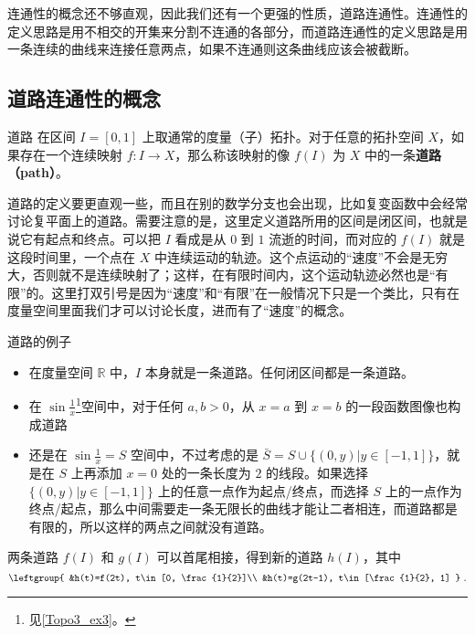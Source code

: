 
连通性的概念还不够直观，因此我们还有一个更强的性质，道路连通性。连通性的定义思路是用不相交的开集来分割不连通的各部分，而道路连通性的定义思路是用一条连续的曲线来连接任意两点，如果不连通则这条曲线应该会被截断。

\subsection{道路连通性的概念}
\begin{definition}{道路}\label{Topo4_def1}
在区间 $I=[0,1]$ 上取通常的度量（子）拓扑。对于任意的拓扑空间 $X$，如果存在一个连续映射 $f: I\rightarrow X$，那么称该映射的像 $f(I)$ 为 $X$ 中的一条\textbf{道路（path）}。
\end{definition}

道路的定义要更直观一些，而且在别的数学分支也会出现，比如复变函数中会经常讨论复平面上的道路。需要注意的是，这里定义道路所用的区间是闭区间，也就是说它有起点和终点。可以把 $I$ 看成是从 $0$ 到 $1$ 流逝的时间，而对应的 $f(I)$ 就是这段时间里，一个点在 $X$ 中连续运动的轨迹。这个点运动的“速度”不会是无穷大，否则就不是连续映射了；这样，在有限时间内，这个运动轨迹必然也是“有限”的。这里打双引号是因为“速度”和“有限”在一般情况下只是一个类比，只有在度量空间里面我们才可以讨论长度，进而有了“速度”的概念。

\begin{example}{道路的例子}\label{Topo4_ex1}
\begin{itemize}
\item 在度量空间 $\mathbb{R}$ 中，$I$ 本身就是一条道路。任何闭区间都是一条道路。
\item 在 $\sin{\frac{1}{x}}$\footnote{见\autoref{Topo3_ex3}。}空间中，对于任何 $a, b>0$，从 $x=a$ 到 $x=b$ 的一段函数图像也构成道路
\item 还是在 $\sin{\frac{1}{x}}=S$ 空间中，不过考虑的是 $\bar{S}=S\cup\{(0, y)|y\in [-1,1]\}$，就是在 $S$ 上再添加 $x=0$ 处的一条长度为 $2$ 的线段。如果选择 $\{(0, y)|y\in [-1,1]\}$ 上的任意一点作为起点/终点，而选择 $S$ 上的一点作为终点/起点，那么中间需要走一条无限长的曲线才能让二者相连，而道路都是有限的，所以这样的两点之间就没有道路。

\end{itemize}
\end{example}

两条道路 $f(I)$ 和 $g(I)$ 可以首尾相接，得到新的道路 $h(I)$，其中
\begin{equation}
\leftgroup{
&h(t)=f(2t), t\in[0, \frac{1}{2}]\\
&h(t)=g(2t-1), t\in[\frac{1}{2}, 1]
}~.
\end{equation}


